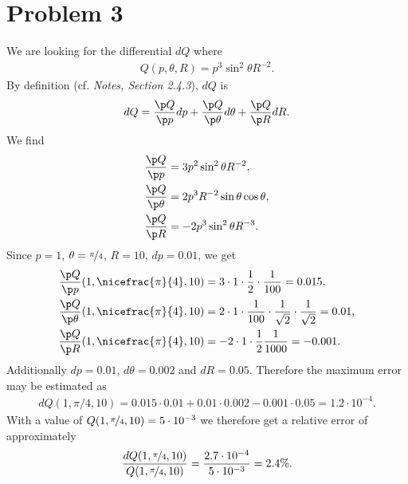 \documentclass{article}
\begin{document}
\section*{Problem 3}
We are looking for the differential $dQ$ where
\begin{align*}
  Q(p, \theta, R)=p^3\sin^2\theta R^{-2}.
\end{align*}
By definition (cf. \emph{Notes, Section 2.4.3}), $dQ$ is
\begin{align*}
  dQ=\frac{\p Q}{\p p}dp + \frac{\p Q}{\p\theta}d\theta + \frac{\p Q}{\p R}dR.
\end{align*}
We find
\begin{align*}
  \frac{\p Q}{\p p}     & = 3p^2\sin^2\theta R^{-2},        \\
  \frac{\p Q}{\p\theta} & = 2p^3R^{-2}\sin\theta\cos\theta, \\
  \frac{\p Q}{\p R}     & =-2p^3\sin^2\theta R^{-3}.
\end{align*}
Since $p=1$, $\theta=\nicefrac{\pi}{4}$, $R=10$, $dp=0.01$, we get
\begin{align*}
  \frac{\p Q}{\p p}(1, \nicefrac{\pi}{4}, 10)
   & =3\cdot 1 \cdot \frac{1}{2} \cdot \frac{1}{100}=0.015,                             \\
  \frac{\p Q}{\p\theta}(1, \nicefrac{\pi}{4}, 10)
   & =2\cdot 1 \cdot \frac{1}{100}\cdot\frac{1}{\sqrt{2}}\cdot\frac{1}{\sqrt{2}} =0.01, \\
  \frac{\p Q}{\p R}(1, \nicefrac{\pi}{4}, 10)
   & = -2\cdot 1 \cdot \frac{1}{2}\frac{1}{1000}=-0.001.
\end{align*}
Additionally $dp = 0.01$, $d\theta = 0.002$ and $dR=0.05$.
Therefore the maximum error may be estimated as
\begin{align*}
  dQ(1,\pi/4,10)=0.015\cdot 0.01+0.01\cdot 0.002  -0.001 \cdot 0.05=1.2\cdot10^{-4}.
\end{align*}
With a value of $Q(1,\nicefrac{\pi}{4},10)=5\cdot10^{-3}$ we therefore get a
relative error of approximately
\begin{align*}
  \frac{dQ(1,\nicefrac{\pi}{4},10)}{Q(1,\nicefrac{\pi}{4},10)}=\frac{2.7\cdot10^{-4}}{5\cdot 10^{-3}}=2.4\%.
\end{align*}
\end{document}
